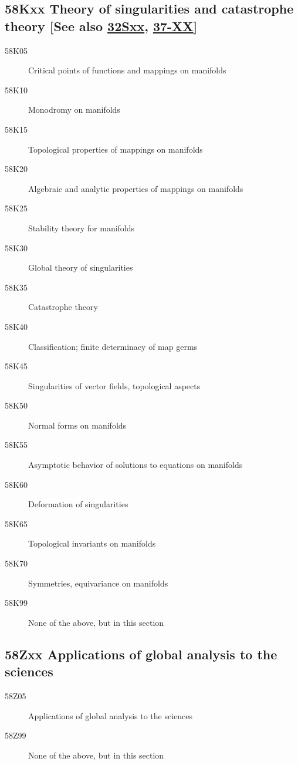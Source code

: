 \subsection*{58Kxx  Theory of singularities and catastrophe theory [See also \hyperref[32Sxx]{32Sxx}, \hyperref[37-XX]{37-XX}] }\label{58Kxx}
\begin{description}  
\item [58K05]\label{58K05} Critical points of functions and mappings on manifolds
\item [58K10]\label{58K10} Monodromy on manifolds
\item [58K15]\label{58K15} Topological properties of mappings on manifolds
\item [58K20]\label{58K20} Algebraic and analytic properties of mappings on manifolds
\item [58K25]\label{58K25} Stability theory for manifolds
\item [58K30]\label{58K30} Global theory of singularities
\item [58K35]\label{58K35} Catastrophe theory
\item [58K40]\label{58K40} Classification; finite determinacy of map germs
\item [58K45]\label{58K45} Singularities of vector fields, topological aspects
\item [58K50]\label{58K50} Normal forms on manifolds
\item [58K55]\label{58K55} Asymptotic behavior of solutions to equations on manifolds
\item [58K60]\label{58K60} Deformation of singularities
\item [58K65]\label{58K65} Topological invariants on manifolds
\item [58K70]\label{58K70} Symmetries, equivariance on manifolds
\item [58K99]\label{58K99} None of the above, but in this section
\end{description}
\subsection*{58Zxx   Applications of global analysis to the sciences}\label{58Zxx}
\begin{description}  
\item [58Z05]\label{58Z05}  Applications of global analysis to the sciences
\item [58Z99]\label{58Z99} None of the above, but in this section
\end{description}
